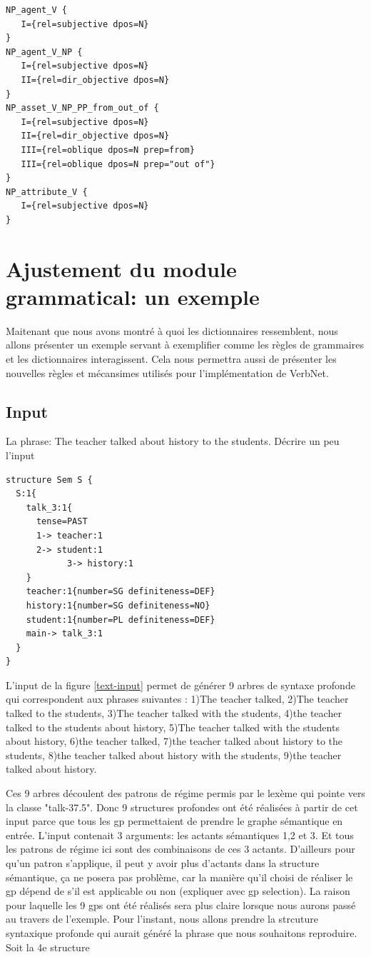 \begin{lstlisting}[language=XML, caption = Gpcon]
NP_agent_V {
   I={rel=subjective dpos=N}
}
NP_agent_V_NP {
   I={rel=subjective dpos=N}
   II={rel=dir_objective dpos=N}
}
NP_asset_V_NP_PP_from_out_of {
   I={rel=subjective dpos=N}
   II={rel=dir_objective dpos=N}
   III={rel=oblique dpos=N prep=from}
   III={rel=oblique dpos=N prep="out of"}
}
NP_attribute_V {
   I={rel=subjective dpos=N}
}
\end{lstlisting}

\section{Ajustement du module grammatical: un exemple}
Maitenant que nous avons montré à quoi les dictionnaires ressemblent, nous allons présenter un exemple servant à exemplifier comme les règles de grammaires et les dictionnaires interagissent. Cela nous permettra aussi de présenter les nouvelles règles et mécansimes utilisés pour l'implémentation de VerbNet.

\subsection{Input}
La phrase: The teacher talked about history to the students. Décrire un peu l'input

\begin{lstlisting}[language=XML, caption=Input textuel, label=text-input]
structure Sem S {
  S:1{
    talk_3:1{
      tense=PAST 
      1-> teacher:1
      2-> student:1
			3-> history:1
    }
    teacher:1{number=SG definiteness=DEF}
    history:1{number=SG definiteness=NO}
    student:1{number=PL definiteness=DEF}
    main-> talk_3:1
  }
}
\end{lstlisting}

L'input de la figure \ref{text-input} permet de générer 9 arbres de syntaxe profonde qui correspondent aux phrases suivantes : 1)The teacher talked, 2)The teacher talked to the students, 3)The teacher talked with the students, 4)the teacher talked to the students about history, 5)The teacher talked with the students about history, 6)the teacher talked, 7)the teacher talked about history to the students, 8)the teacher talked about history with the students, 9)the teacher talked about history.

Ces 9 arbres découlent des patrons de régime permis par le lexème  qui pointe vers la classe "talk-37.5". Donc 9 structures profondes ont été réalisées à partir de cet input parce que tous les gp permettaient de prendre le graphe sémantique en entrée. L'input contenait 3 arguments: les actants sémantiques 1,2 et 3. Et tous les patrons de régime ici sont des combinaisons de ces 3 actants. D'ailleurs pour qu'un patron s'applique, il peut y avoir plus d'actants dans la structure sémantique, ça ne posera pas problème, car la manière qu'il choisi de réaliser le gp dépend de s'il est applicable ou non (expliquer avec gp selection). La raison pour laquelle les 9 gps ont été réalisés sera plus claire lorsque nous aurons passé au travers de l'exemple. Pour l'instant, nous allons prendre la strcuture syntaxique profonde qui aurait généré la phrase que nous souhaitons reproduire. Soit la 4e structure

